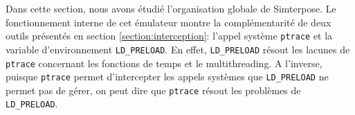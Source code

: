 Dans cette section, nous avons étudié l'organisation globale de Simterpose. Le
fonctionnement interne de cet émulateur montre la complémentarité de deux outils
présentés en section \ref{section:interception}: l'appel
système \texttt{ptrace} et la variable d'environnement \texttt{LD\_PRELOAD}. En
effet, \texttt{LD\_PRELOAD} résout les lacunes de \texttt{ptrace} concernant les
fonctions de temps et le multithreading. A l'inverse, puisque \texttt{ptrace}
permet d'intercepter les appels systèmes que \texttt{LD\_PRELOAD} ne permet pas
de gérer, on peut dire que \texttt{ptrace} résout les problèmes
de \texttt{LD\_PRELOAD}.
